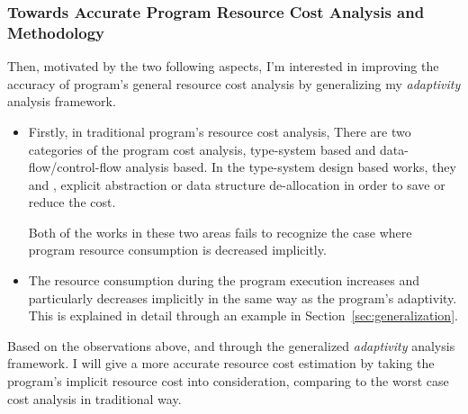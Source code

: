 \subsubsection{Towards Accurate Program Resource Cost Analysis and Methodology}
\label{subsec:intro-cost}

Then, motivated by the two following aspects,  I'm interested in improving the accuracy of program's general resource cost analysis
by generalizing my \emph{adaptivity} analysis framework.
\begin{itemize}
    \item Firstly, in traditional program's resource cost analysis,
    There are two categories of the program cost analysis, type-system based  and data-flow/control-flow analysis based. 
    In the type-system design based works, they \cite{GustafssonEL05} and \cite{hoffmann_jost_2022}, explicit abstraction or data structure de-allocation in order to save or reduce the cost.
    
    Both of the
    works in these two areas fails to recognize the case where program resource consumption is decreased implicitly.
    \item The resource consumption during the program 
    execution increases and particularly decreases implicitly in the same way as the program's adaptivity. This is explained in detail through an example in Section~\ref*{sec:generalization}.
\end{itemize}
   Based on the observations above, and through the generalized \emph{adaptivity} analysis framework.
   I will give
   a more accurate resource cost estimation by taking the program's implicit resource cost into consideration, comparing 
   to the worst case cost analysis in traditional way.

